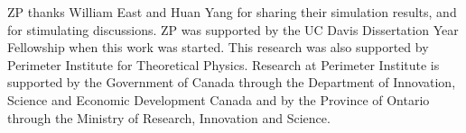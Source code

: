 \documentclass[aps,prd,reprint,nofootinbib, superscriptaddress]{revtex4-1}
\begin{document}
\acknowledgements
ZP thanks William East and Huan Yang for sharing their simulation results,
and for stimulating discussions.
ZP was supported by the UC Davis Dissertation Year Fellowship when this work was started.
This research was also supported by Perimeter Institute for Theoretical Physics.
Research at Perimeter Institute is supported by the Government of Canada
through the Department of Innovation, Science and Economic Development Canada
and by the Province of Ontario through the Ministry of Research, Innovation and Science.




\end{document}
